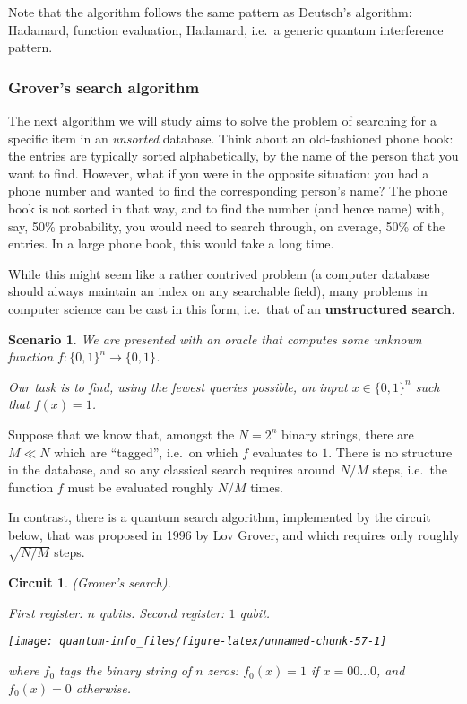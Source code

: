 \documentclass[fleqn]{article}
\newtheorem*{scenario}{Scenario}
\newtheorem*{circuit}{Circuit}
\begin{document}
Note that the algorithm follows the same pattern as Deutsch's algorithm: Hadamard, function evaluation, Hadamard, i.e.~a generic quantum interference pattern.

\hypertarget{grovers-search-algorithm}{%
\subsubsection{Grover's search algorithm}\label{grovers-search-algorithm}}

The next algorithm we will study aims to solve the problem of searching for a specific item in an \emph{unsorted} database.
Think about an old-fashioned phone book: the entries are typically sorted alphabetically, by the name of the person that you want to find.
However, what if you were in the opposite situation: you had a phone number and wanted to find the corresponding person's name?
The phone book is not sorted in that way, and to find the number (and hence name) with, say, 50\% probability, you would need to search through, on average, 50\% of the entries.
In a large phone book, this would take a long time.

While this might seem like a rather contrived problem (a computer database should always maintain an index on any searchable field), many problems in computer science can be cast in this form, i.e.~that of an \textbf{unstructured search}.

\begin{scenario}

We are presented with an oracle that computes some unknown function \(f\colon\{0,1\}^n\to\{0,1\}\).

Our task is to find, using the fewest queries possible, an input \(x\in\{0,1\}^n\) such that \(f(x)=1\).

\end{scenario}

Suppose that we know that, amongst the \(N=2^n\) binary strings, there are \(M\ll N\) which are ``tagged'', i.e.~on which \(f\) evaluates to \(1\).
There is no structure in the database, and so any classical search requires around \(N/M\) steps, i.e.~the function \(f\) must be evaluated roughly \(N/M\) times.

In contrast, there is a quantum search algorithm, implemented by the circuit below, that was proposed in 1996 by Lov Grover, and which requires only roughly \(\sqrt{N/M}\) steps.

\begin{circuit}

(Grover's search).

\emph{First register: \(n\) qubits. Second register: \(1\) qubit.}

\begin{center}\texttt{[image: quantum-info\_files/figure-latex/unnamed-chunk-57-1]} \end{center}

where \(f_0\) tags the binary string of \(n\) zeros: \(f_0(x)=1\) if \(x=00\ldots0\), and \(f_0(x)=0\) otherwise.

\end{circuit}
\end{document}
